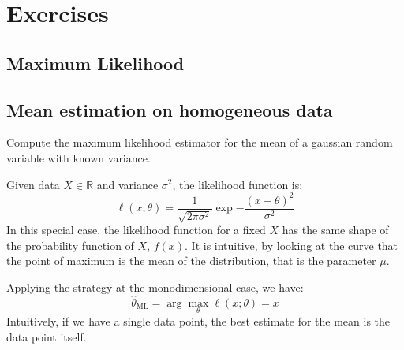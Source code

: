 
\section{Exercises}
\subsection{Maximum Likelihood}
\subsection{Mean estimation on homogeneous data}
\begin{exercise}
    Compute the maximum likelihood estimator for the mean of a gaussian random variable with known variance.
\end{exercise}
Given data $X \in \mathbb{R}$ and variance $\sigma^2$, the likelihood function is:
\[
    \ell(x;\theta) = \frac{1}{\sqrt{2\pi\sigma^2}} \exp{-\frac{(x-\theta)^2}{\sigma^2}}
\]
In this special case, the likelihood function for a fixed $X$ has the same shape of the probability function of $X$, $f(x)$. 
It is intuitive, by looking at the curve that the point of maximum is the mean of the distribution, that is the parameter $\mu$.

Applying the strategy at the monodimensional case, we have:
\[
    \hat{\theta}_{\text{ML}} = \arg\max_{\theta} \ell(x; \theta) = x
\]
Intuitively, if we have a single data point, the best estimate for the mean is the data point itself.

